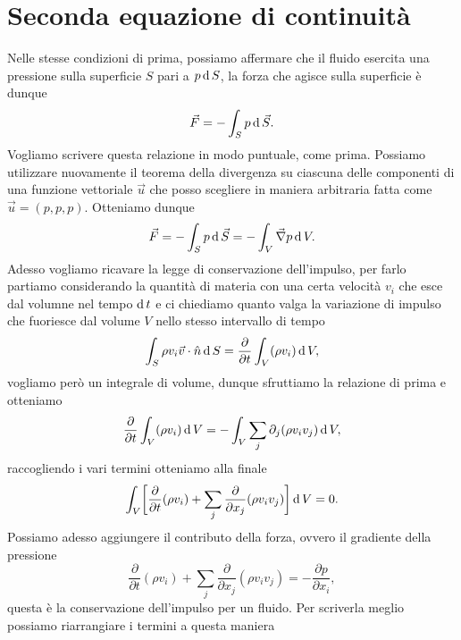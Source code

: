 \section{Seconda equazione di continuità}
Nelle stesse condizioni di prima, possiamo affermare che il fluido esercita una pressione sulla superficie $S$ pari a $p \operatorname{d} S$, la forza che agisce sulla superficie è dunque 
\begin{equation*}
    \vec{F} = - \int_S p\operatorname{d} \vec{S}. 
\end{equation*}
Vogliamo scrivere questa relazione in modo puntuale, come prima. Possiamo utilizzare nuovamente il teorema della divergenza su ciascuna delle componenti di una funzione vettoriale $\vec{u}$ che posso scegliere in maniera arbitraria fatta come $\vec{u} = (p, p, p)$. Otteniamo dunque
\begin{equation*}
    \vec{F} = - \int_S p\operatorname{d} \vec{S} = - \int_V \vec{\nabla} p \operatorname{d} V.
\end{equation*}
Adesso vogliamo ricavare la legge di conservazione dell'impulso, per farlo partiamo considerando la quantità di materia con una certa velocità $v_i$ che esce dal volumne nel tempo $\operatorname{d} t$ e ci chiediamo quanto valga la variazione di impulso che fuoriesce dal volume $V$ nello stesso intervallo di tempo
\begin{equation*}
    \int_S \rho v_i \vec{v} \cdot \hat{n} \operatorname{d} S = \frac{\partial}{\partial t} \int_V (\rho v_i) \operatorname{d} V,
\end{equation*}
vogliamo però un integrale di volume, dunque sfruttiamo la relazione di prima e otteniamo
\begin{equation*}
    \frac{\partial}{\partial t} \int_V (\rho v_i) \operatorname{d} V = - \int_V \sum_j \partial_j (\rho v_i v_j) \operatorname{d} V,
\end{equation*}
raccogliendo i vari termini otteniamo alla finale
\begin{equation*}
    \int_V \biggl[ \frac{\partial}{\partial t} (\rho v_i) + \sum_j\frac{\partial}{\partial x_j}(\rho v_i v_j) \biggr] \operatorname{d} V = 0.
\end{equation*}
Possiamo adesso aggiungere il contributo della forza, ovvero il gradiente della pressione
\begin{equation}
    \frac{\partial}{\partial t} (\rho v_i) + \sum_j\frac{\partial}{\partial x_j}(\rho v_i v_j) = - \frac{\partial p}{\partial x_i},\label{eq:rhovivj}
\end{equation}
questa è la conservazione dell'impulso per un fluido. Per scriverla meglio possiamo riarrangiare i termini a questa maniera
